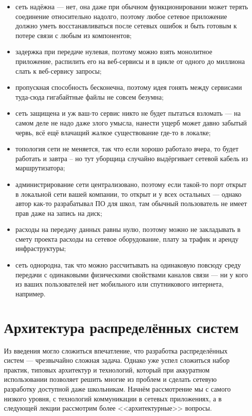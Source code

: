 \documentclass[a5paper]{article}
\begin{document}
\begin{itemize}
    \item сеть надёжна --- нет, она даже при обычном функционировании может терять соединение относительно надолго, поэтому любое сетевое приложение должно уметь восстанавливаться после сетевых ошибок и быть готовым к потере связи с любым из компонентов;
    \item задержка при передаче нулевая, поэтому можно взять монолитное приложение, распилить его на веб-сервисы и в цикле от одного до миллиона слать к веб-сервису запросы;
    \item пропускная способность бесконечна, поэтому идея гонять между сервисами туда-сюда гигабайтные файлы не совсем безумна;
    \item сеть защищена и уж ваш-то сервис никто не будет пытаться взломать --- на самом деле не надо даже злого умысла, нанести ущерб может давно забытый червь, всё ещё влачащий жалкое существование где-то в локалке;
    \item топология сети не меняется, так что если хорошо работало вчера, то будет работать и завтра -- но тут уборщица случайно выдёргивает сетевой кабель из маршрутизатора;
    \item администрирование сети централизовано, поэтому если такой-то порт открыт в локальной сети вашей компании, то открыт и у всех остальных --- однако автор как-то разрабатывал ПО для школ, там обычный пользователь не имеет прав даже на запись на диск;
    \item расходы на передачу данных равны нулю, поэтому можно не закладывать в смету проекта расходы на сетевое оборудование, плату за трафик и аренду инфраструктуры;
    \item сеть однородна, так что можно рассчитывать на одинаковую повсюду среду передачи с одинаковыми физическими свойствами каналов связи --- ни у кого из ваших пользователей нет мобильного или спутникового интернета, например.
\end{itemize}

\section{Архитектура распределённых систем}

Из введения могло сложиться впечатление, что разработка распределённых систем --- чрезвычайно сложная задача. Однако уже успел сложиться набор практик, типовых архитектур и технологий, который при аккуратном использовании позволяет решить многие из проблем и сделать сетевую разработку доступной даже школьникам. Начнём рассмотрение мы с самого низкого уровня, с технологий коммуникации в сетевых приложениях, а в следующей лекции рассмотрим более <<архитектурные>> вопросы.
\end{document}
